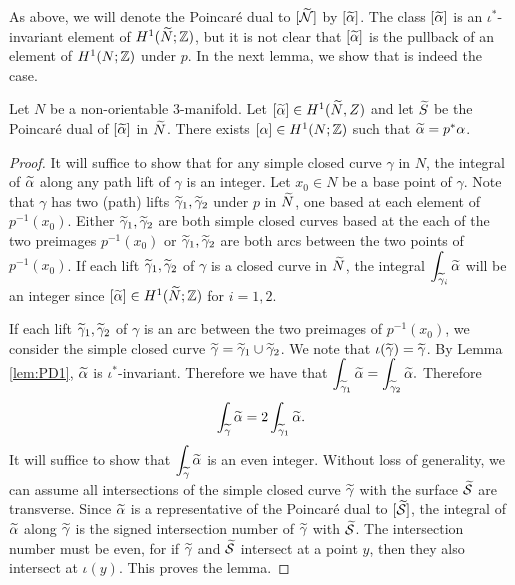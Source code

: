 As above, we will denote the Poincar\'e dual to $[\widetilde{\mathcal{N}}]$ by $[\widetilde{\alpha}]$.  The class $[\widetilde{\alpha}]$ is an $\iota^{\ast}$-invariant element of $H^1(\widetilde{N}; \mathbb{Z})$, but it is not clear that $[\widetilde{\alpha}]$ is the pullback of an element of $H^1(N; \mathbb{Z})$ under $p$.
In the next lemma, we show that is indeed the case.%
\begin{lem}
  \label{lem:PD2}
Let $N$ be a non-orientable 3-manifold.  Let $[\widetilde{\alpha}]\in H^1(\widetilde{N}, Z)$ and let $\widetilde{S}$ be the Poincar\'e dual of $[\widetilde{\alpha}]$ in $\widetilde{N}$.  There exists $[\alpha] \in H^1(N; \mathbb{Z})$ such that $\widetilde{\alpha} = p^{\ast} \alpha$.
\end{lem}
\begin{proof}
 It will suffice to show that for any simple closed curve $\gamma$ in $N$, the integral of $\widetilde{\alpha}$ along any path lift of $\gamma$ is an integer.  Let $x_0\in N$ be a base point of $\gamma$.  Note that $\gamma$ has two (path) lifts $\widetilde{\gamma}_1,\widetilde{\gamma}_2$ under $p$ in $\widetilde{N}$, one based at each element of $p^{-1}(x_0)$.  Either $\widetilde{\gamma}_1,\widetilde{\gamma}_2$ are both simple closed curves based at the each of the two preimages $p^{-1}(x_0)$ or $\widetilde{\gamma}_1,\widetilde{\gamma}_2$ are both arcs between the two points of $p^{-1}(x_0)$.
  If each lift $\widetilde{\gamma}_1,\widetilde{\gamma}_2$ of $\gamma$ is a closed curve in $\widetilde{N}$, the integral $\displaystyle\int_{\widetilde{\gamma}_i}\widetilde{\alpha}$ will be an integer since $[\widetilde{\alpha}] \in H^1(\widetilde{N}; \mathbb{Z})$ for $i=1,2$.

 If each lift $\widetilde{\gamma}_1,\widetilde{\gamma}_2$ of $\gamma$ is an arc between the two preimages of $p^{-1}(x_0)$, we consider the simple closed curve $\widetilde{\gamma}=\widetilde{\gamma}_1\cup\widetilde{\gamma}_2$.  We note that $\iota(\widetilde{\gamma})=\widetilde{\gamma}$.
  By Lemma \ref{lem:PD1}, $\widetilde{\alpha}$ is $\iota^{\ast}$-invariant.  Therefore we have that $ \displaystyle\int_{\widetilde{\gamma}_1} \widetilde{\alpha} = \displaystyle\int_{\widetilde{\gamma}_2} \widetilde{\alpha}.$  Therefore $$\int_{\widetilde{\gamma}}\widetilde{\alpha}=2\int_{\widetilde{\gamma}_1}\widetilde{\alpha}.$$ It will suffice to show that $\displaystyle\int_{\widetilde{\gamma}}\widetilde{\alpha}$ is an even integer.
  Without loss of generality, we can assume all intersections of the simple closed curve $\widetilde{\gamma}$ with the surface $\widetilde{\mathcal{S}}$ are transverse.
  Since $\widetilde{\alpha}$ is a representative of the Poincar\'e dual to $[\widetilde{\mathcal{S}}]$, the integral of $\widetilde{\alpha}$ along $\widetilde{\gamma}$ is the signed intersection number of $\widetilde{\gamma}$ with $\widetilde{\mathcal{S}}$.
  The intersection number must be even, for if $\widetilde{\gamma}$ and $\widetilde{\mathcal{S}}$ intersect at a point $y$, then they also intersect at $\iota(y)$. This proves the lemma.
\end{proof}

